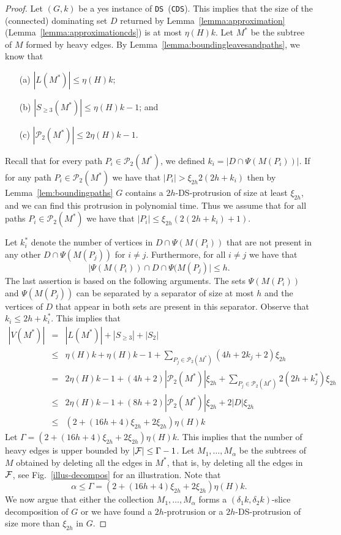 \documentclass[11pt]{article}
\newcommand{\tDS}{{\texttt{\sc DS}}}
\newcommand{\tCDS}{{\texttt{\sc CDS}}}
\begin{document}
\begin{proof}
Let $(G,k)$ be a yes instance of \tDS\  (\tCDS). This implies that the size of the (connected) dominating set $D$ returned by Lemma~\ref{lemma:approximation} (Lemma~\ref{lemma:approximationcds}) is at most $\eta(H)k$. 
Let $M^*$ be the subtree of $M$ formed by  heavy edges. By Lemma~\ref{lemma:boundingleavesandpaths}, we know that 
\begin{itemize}
\item[(a)] $|L(M^*)| \leq \eta(H) k$; 
\item[(b)] $|S_{\geq 3}(M^*)|\leq \eta(H) k-1$; and
\item[(c)] $|\mathscr{P}_2(M^*)|\leq 2 \eta(H) k-1$.  
 \end{itemize}
 Recall that for every path  $P_i \in \mathscr{P}_2(M^*)$, we defined $k_i=|D\cap \Psi(M(P_i))|$. If for any path $P_i \in \mathscr{P}_2(M^*)$ we have that $|P_i|> \xi_{2h} 2 (2h+k_i)$ then by Lemma~\ref{lem:boundingpaths}  $G$ contains a $2h$-{\sc DS}-protrusion of size at least $\xi_{2h}$, and we can find this protrusion in polynomial time. Thus we assume that for all paths $P_i \in \mathscr{P}_2(M^*)$ we have that $|P_i| \leq \xi_{2h} (2 (2h+k_i)+1)$. 

Let $k_i^*$ denote the number of vertices in $D\cap \Psi(M(P_i))$ that are not present in any other 
$D\cap \Psi(M(P_j))$ for $i\neq j$. Furthermore, for all $i\neq j$ we have that 
$$\Big|\Psi(M(P_i))\cap D\cap \Psi(M(P_j) \Big| \leq h.$$
The last assertion is based on the following arguments. The sets $\Psi(M(P_i))$ and  $\Psi(M(P_j))$ can be separated by a separator of size at most $h$ and the vertices of $D$ that appear in  both sets are present in this separator. 
Observe that $k_i\leq 2h+k_i^*$. 
This implies that 
\begin{eqnarray*}
|V(M^*)| & = & |L(M^*)|+|S_{\geq 3}|+|S_{2}| \\
&\leq & \eta(H)k + \eta(H) k-1 + \sum_{P_j\in \mathscr{P}_2(M^*)} (4h+2k_j+2)\xi_{2h} \\
& = & 2 \eta(H)k-1+ (4h+2) |\mathscr{P}_2(M^*)| \xi_{2h} +  \sum_{P_j\in \mathscr{P}_2(M^*)} 2(2h+ k_j^*)\xi_{2h}\\ 
& \leq & 2 \eta(H)k-1+ (8h+2) |\mathscr{P}_2(M^*)|\xi_{2h}+ 2|D| \xi_{2h}\\
& \leq & (2+ (16h+4)\xi_{2h}+2 \xi_{2h})\eta(H)k
\end{eqnarray*}
Let $\Gamma=(2+ (16h+4)\xi_{2h}+2 \xi_{2h})\eta(H)k$. 
This implies that the number of heavy edges is upper bounded by $|{\cal F}|\leq \Gamma-1$. Let $M_1,\ldots,M_\alpha$ be the subtrees of $M$ obtained by deleting all the edges in $M^*$, that is, by deleting all the edges in $\cal F$,  see Fig.~\ref{illus-decompos} for an illustration. Note that \[\alpha\leq \Gamma= (2+ (16h+4)\xi_{2h}+2 \xi_{2h})\eta(H)k.\]  We now argue that either the collection $M_1,\ldots,M_\alpha$ forms a $(\delta_1k,\delta_2 k)$-slice decomposition of $G$ or we have found a $2h$-protrusion or a $2h$-{\sc DS}-protrusion of size more than $\xi_{2h}$ in $G$. 



\end{proof}
\end{document}
